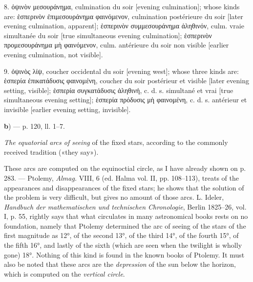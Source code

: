 \documentclass[11pt]{article}
\begin{document}
\par 8. {\greekfont ὀψινὸν μεσουράνημα}, culmination du soir [evening culmination]; whose kinds are: {\greekfont ἑσπερινὸν ἐπιμεσουράνημα φαινόμενον}, culmination postérieure du soir [later evening culmination, apparent]; {\greekfont ἑσπερινὸν συμμεσουράνημα ἀληθινόν}, culm. vraie simultanée du soir [true simultaneous evening culmination]; {\greekfont ἑσπερινὸν προμεσουράνημα μὴ φαινόμενον}, culm. antérieure du soir non visible [earlier evening culmination, not visible].\par
\par 9. {\greekfont ὀψινὸς λίψ}, coucher occidental du soir [evening west]; whose three kinds are: {\greekfont ἑσπερία ἐπικατάδυσις φαινομένη}, coucher du soir postérieur et visible [later evening setting, visible]; {\greekfont ἑσπερία συγκατάδυσις ἀληθινή}, c. d. s. simultané et vrai [true simultaneous evening setting]; {\greekfont ἑσπερία πρόδυσις μὴ φαινομένη}, c. d. s. antérieur et invisible [earlier evening setting, invisible].\par
\par\begin{center}\textbf{b}) — p. 120, ll. 1–7.\end{center}
\par \emph{The equatorial arcs of seeing} of the fixed stars, according to the commonly received tradition («they say»).\par
\par These arcs are computed on the equinoctial circle, as I have already shown on p. 283. — Ptolemy, \emph{Almag.} VIII, 6 (ed. Halma vol. II, pp. 108–113), treats of the appearances and disappearances of the fixed stars; he shows that the solution of the problem is very difficult, but gives no amount of those arcs. L. Ideler, \emph{Handbuch der mathematischen und technischen Chronologie}, Berlin 1825–26, vol. I, p. 55, rightly says that what circulates in many astronomical books rests on no foundation, namely that Ptolemy determined the arc of seeing of the stars of the first magnitude as 12°, of the second 13°, of the third 14°, of the fourth 15°, of the fifth 16°, and lastly of the sixth (which are seen when the twilight is wholly gone) 18°. Nothing of this kind is found in the known books of Ptolemy. It must also be noted that these arcs are the \emph{depression} of the sun below the horizon, which is computed on the \emph{vertical circle}.\par
\end{document}
